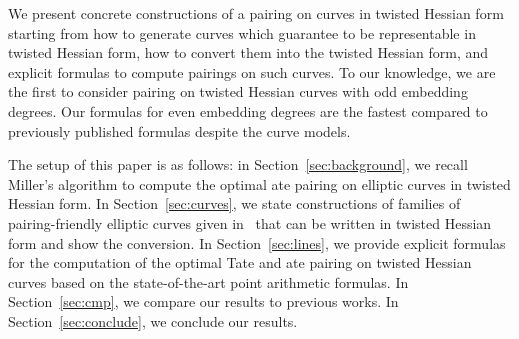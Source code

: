 We present concrete constructions of a pairing on curves in twisted Hessian form starting
from how to generate curves which guarantee to be representable in twisted Hessian form,
how to convert them into the twisted Hessian form, and
explicit formulas to compute pairings on such curves.
To our knowledge, we are the first to consider pairing on twisted Hessian curves with odd embedding degrees.
Our formulas for even embedding degrees are the fastest compared to previously published formulas despite the curve models.

The setup of this paper is as follows:
in Section~\ref{sec:background}, we recall Miller's algorithm to compute the optimal ate pairing on elliptic curves in twisted Hessian form.
In Section~\ref{sec:curves}, we state constructions of families of pairing-friendly elliptic curves given in~\cite{2010/freeman}
that can be written in twisted Hessian form and show the conversion.
In Section~\ref{sec:lines}, we provide explicit formulas for the computation of the optimal Tate and ate pairing on twisted Hessian curves
based on the state-of-the-art point arithmetic formulas.
In Section~\ref{sec:cmp}, we compare our results to previous works.
In Section~\ref{sec:conclude}, we conclude our results.


